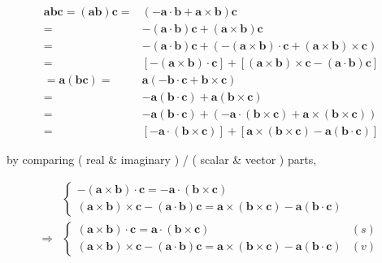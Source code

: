 \documentclass[
]{book}
\theoremstyle{definition}
\theoremstyle{definition}
\theoremstyle{definition}
\theoremstyle{definition}
\theoremstyle{remark}
\begin{document}
\[
\begin{aligned}
\boldsymbol{a}\boldsymbol{b}\boldsymbol{c}=\left(\boldsymbol{a}\boldsymbol{b}\right)\boldsymbol{c}= & \left(-\boldsymbol{a}\cdot\boldsymbol{b}+\boldsymbol{a}\times\boldsymbol{b}\right)\boldsymbol{c}\\
= & -\left(\boldsymbol{a}\cdot\boldsymbol{b}\right)\boldsymbol{c}+\left(\boldsymbol{a}\times\boldsymbol{b}\right)\boldsymbol{c}\\
= & -\left(\boldsymbol{a}\cdot\boldsymbol{b}\right)\boldsymbol{c}+\left(-\left(\boldsymbol{a}\times\boldsymbol{b}\right)\cdot\boldsymbol{c}+\left(\boldsymbol{a}\times\boldsymbol{b}\right)\times\boldsymbol{c}\right)\\
= & \left[-\left(\boldsymbol{a}\times\boldsymbol{b}\right)\cdot\boldsymbol{c}\right]+\left[\left(\boldsymbol{a}\times\boldsymbol{b}\right)\times\boldsymbol{c}-\left(\boldsymbol{a}\cdot\boldsymbol{b}\right)\boldsymbol{c}\right]\\
=\boldsymbol{a}\left(\boldsymbol{b}\boldsymbol{c}\right)= & \boldsymbol{a}\left(-\boldsymbol{b}\cdot\boldsymbol{c}+\boldsymbol{b}\times\boldsymbol{c}\right)\\
= & -\boldsymbol{a}\left(\boldsymbol{b}\cdot\boldsymbol{c}\right)+\boldsymbol{a}\left(\boldsymbol{b}\times\boldsymbol{c}\right)\\
= & -\boldsymbol{a}\left(\boldsymbol{b}\cdot\boldsymbol{c}\right)+\left(-\boldsymbol{a}\cdot\left(\boldsymbol{b}\times\boldsymbol{c}\right)+\boldsymbol{a}\times\left(\boldsymbol{b}\times\boldsymbol{c}\right)\right)\\
= & \left[-\boldsymbol{a}\cdot\left(\boldsymbol{b}\times\boldsymbol{c}\right)\right]+\left[\boldsymbol{a}\times\left(\boldsymbol{b}\times\boldsymbol{c}\right)-\boldsymbol{a}\left(\boldsymbol{b}\cdot\boldsymbol{c}\right)\right]
\end{aligned}
\]

by comparing ( real \& imaginary ) / ( scalar \& vector ) parts,

\[
\begin{aligned}
 & \begin{cases}
-\left(\boldsymbol{a}\times\boldsymbol{b}\right)\cdot\boldsymbol{c}=-\boldsymbol{a}\cdot\left(\boldsymbol{b}\times\boldsymbol{c}\right)\\
\left(\boldsymbol{a}\times\boldsymbol{b}\right)\times\boldsymbol{c}-\left(\boldsymbol{a}\cdot\boldsymbol{b}\right)\boldsymbol{c}=\boldsymbol{a}\times\left(\boldsymbol{b}\times\boldsymbol{c}\right)-\boldsymbol{a}\left(\boldsymbol{b}\cdot\boldsymbol{c}\right)
\end{cases}\\
\Rightarrow & \begin{cases}
\left(\boldsymbol{a}\times\boldsymbol{b}\right)\cdot\boldsymbol{c}=\boldsymbol{a}\cdot\left(\boldsymbol{b}\times\boldsymbol{c}\right) & \left(s\right)\\
\left(\boldsymbol{a}\times\boldsymbol{b}\right)\times\boldsymbol{c}-\left(\boldsymbol{a}\cdot\boldsymbol{b}\right)\boldsymbol{c}=\boldsymbol{a}\times\left(\boldsymbol{b}\times\boldsymbol{c}\right)-\boldsymbol{a}\left(\boldsymbol{b}\cdot\boldsymbol{c}\right) & \left(v\right)
\end{cases}
\end{aligned}
\]
\end{document}
